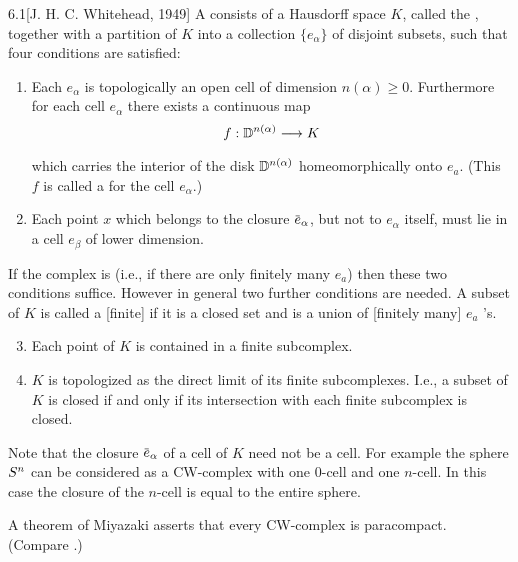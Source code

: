 \documentclass[../main]{subfiles}
\begin{document}
\begin{customdef}{6.1}[J. H. C. Whitehead, 1949]
\label{def:06.01}
A  consists of a Hausdorff space $K$, called the , together with a partition of $K$ into a collection $\{e_{\alpha}\}$ of disjoint subsets, such that four conditions are satisfied:
\begin{enumerate}[label=\arabic*)]
	\item Each $e_{\alpha}$ is topologically an open cell of dimension $n(\alpha) \geq 0$. Furthermore for each cell $e_{\alpha}$ there exists a continuous map
    \[
    f:{\disk^{n(\alpha)}}\varrightarrow{} K
    \]
    which carries the interior of the disk $\mathbb{D}^{n(\alpha)}$ homeomorphically onto $e_{a}$. (This $f$ is called a  for the cell $e_{\alpha}$.)
    \item Each point $x$ which belongs to the closure $\xoverline{e}_{\alpha}$, but not to $e_{\alpha}$ itself, must lie in a cell $e_\beta$ of lower dimension.
\end{enumerate}
If the complex is  (i.e., if there are only finitely many $e_{a}$) then these two conditions suffice. However in general two further conditions are needed. A subset of $K$ is called a [finite]  if it is a closed set and is a union of [finitely many] $e_{a}$ 's.
\begin{enumerate}[label=\arabic*)]
	\setcounter{enumi}{2}
	\item {} Each point of $K$ is contained in a finite subcomplex.
	\item {} $K$ is topologized as the direct limit of its finite subcomplexes. I.e., a subset of $K$ is closed if and only if its intersection with each finite subcomplex is closed.
\end{enumerate}
\end{customdef}
Note that the closure $\xoverline{e}_{\alpha}$ of a cell of $K$ need not be a cell. For example the sphere $S^{n}$ can be considered as a CW-complex with one $0$-cell and one $n$-cell. In this case the closure of the $n$-cell is equal to the entire sphere.

A theorem of Miyazaki \cite{miyazaki1952} asserts that every CW-complex is paracompact. (Compare \cite[p.~419]{dugundji1966}.)
\end{document}
